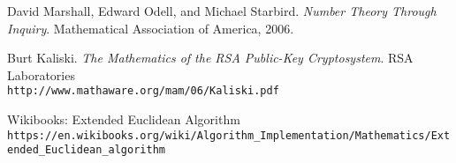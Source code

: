 \documentclass[a4paper]{article}
\begin{document}
\begin{thebibliography}{9}
David Marshall, Edward Odell, and Michael Starbird. 
\textit{Number Theory Through Inquiry}. 
Mathematical Association of America, 2006.
 
Burt Kaliski.
\textit{The Mathematics of the RSA Public-Key Cryptosystem}.
RSA Laboratories
~\\
\texttt{http://www.mathaware.org/mam/06/Kaliski.pdf}
 
Wikibooks: Extended Euclidean Algorithm
~\\
\texttt{https://en.wikibooks.org/wiki/Algorithm\_Implementation/Mathematics/Extended\_Euclidean\_algorithm}
\end{thebibliography}
\end{document}
